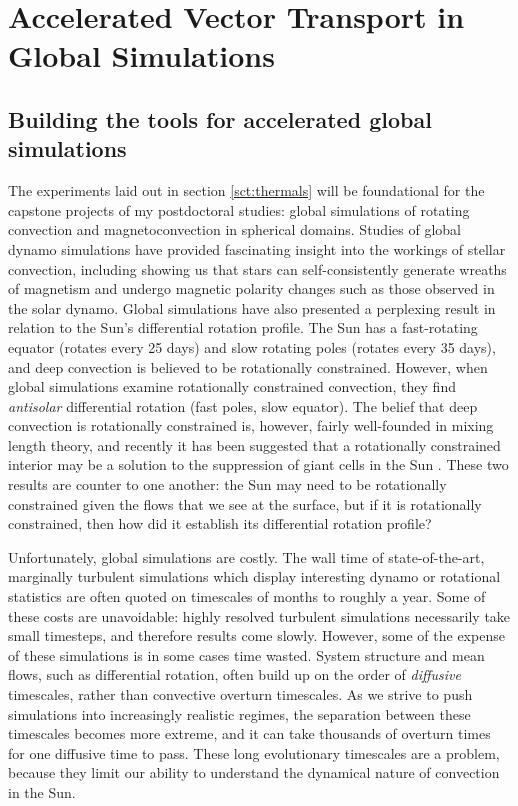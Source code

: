 \documentclass[aasms,12pt]{article}
\begin{document}
\section{Accelerated Vector Transport in Global Simulations}
\label{sct:global_models}
\subsection{Building the tools for accelerated global simulations}
The experiments laid out in section \ref{sct:thermals} will be foundational for the capstone projects of my postdoctoral studies: global simulations of rotating convection and magnetoconvection in spherical domains.
Studies of global dynamo simulations have provided fascinating insight into the workings of stellar convection, including showing us that stars can self-consistently generate wreaths of magnetism and undergo magnetic polarity changes such as those observed in the solar dynamo.
Global simulations have also presented a perplexing result in relation to the Sun's differential rotation profile.
The Sun has a fast-rotating equator (rotates every 25 days) and slow rotating poles (rotates every 35 days), and deep convection is believed to be rotationally constrained.
However, when global simulations examine rotationally constrained convection, they find \emph{antisolar} differential rotation (fast poles, slow equator).
The belief that deep convection is rotationally constrained is, however, fairly well-founded in mixing length theory, and recently it has been suggested that a rotationally constrained interior may be a solution to the suppression of giant cells in the Sun \citep{featherstone&hindman2016}.
These two results are counter to one another: the Sun may need to be rotationally constrained given the flows that we see at the surface, but if it is rotationally constrained, then how did it establish its differential rotation profile?

Unfortunately, global simulations are costly.
The wall time of state-of-the-art, marginally turbulent simulations which display interesting dynamo or rotational statistics are often quoted on timescales of months to roughly a year.
Some of these costs are unavoidable: highly resolved turbulent simulations necessarily take small timesteps, and therefore results come slowly.
However, some of the expense of these simulations is in some cases time wasted.
System structure and mean flows, such as differential rotation, often build up on the order of \emph{diffusive} timescales, rather than convective overturn timescales.
As we strive to push simulations into increasingly realistic regimes, the separation between these timescales becomes more extreme, and it can take thousands of overturn times for one diffusive time to pass.
These long evolutionary timescales are a problem, because they limit our ability to understand the dynamical nature of convection in the Sun.
\end{document}
